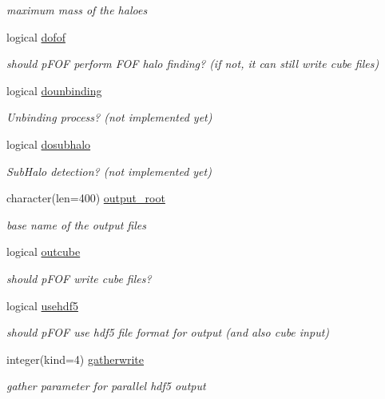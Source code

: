 \begin{DoxyCompactItemize}
\begin{DoxyCompactList}\small\item\em maximum mass of the haloes \end{DoxyCompactList}\item 
logical \hyperlink{classmodparameters_aac53717e97639df9afa75e2947a66f9e}{dofof}
\begin{DoxyCompactList}\small\item\em should p\-F\-O\-F perform F\-O\-F halo finding? (if not, it can still write cube files) \end{DoxyCompactList}\item 
logical \hyperlink{classmodparameters_a80bb718489050f3b3c056aae1774984d}{dounbinding}
\begin{DoxyCompactList}\small\item\em Unbinding process? (not implemented yet) \end{DoxyCompactList}\item 
logical \hyperlink{classmodparameters_ae2628157b1f65431117f867006409948}{dosubhalo}
\begin{DoxyCompactList}\small\item\em Sub\-Halo detection? (not implemented yet) \end{DoxyCompactList}\item 
character(len=400) \hyperlink{classmodparameters_aa1b8579820672ba40e918b0bed1abfc2}{output\-\_\-root}
\begin{DoxyCompactList}\small\item\em base name of the output files \end{DoxyCompactList}\item 
logical \hyperlink{classmodparameters_ad796cf0d67c6d8c47ce651fe7ec0f967}{outcube}
\begin{DoxyCompactList}\small\item\em should p\-F\-O\-F write cube files? \end{DoxyCompactList}\item 
logical \hyperlink{classmodparameters_a035ec12524f64b196a2244ba913b5677}{usehdf5}
\begin{DoxyCompactList}\small\item\em should p\-F\-O\-F use hdf5 file format for output (and also cube input) \end{DoxyCompactList}\item 
integer(kind=4) \hyperlink{classmodparameters_af4816764e904006783425cbe7a1d2498}{gatherwrite}
\begin{DoxyCompactList}\small\item\em gather parameter for parallel hdf5 output \end{DoxyCompactList}\item 

\end{DoxyCompactItemize}

